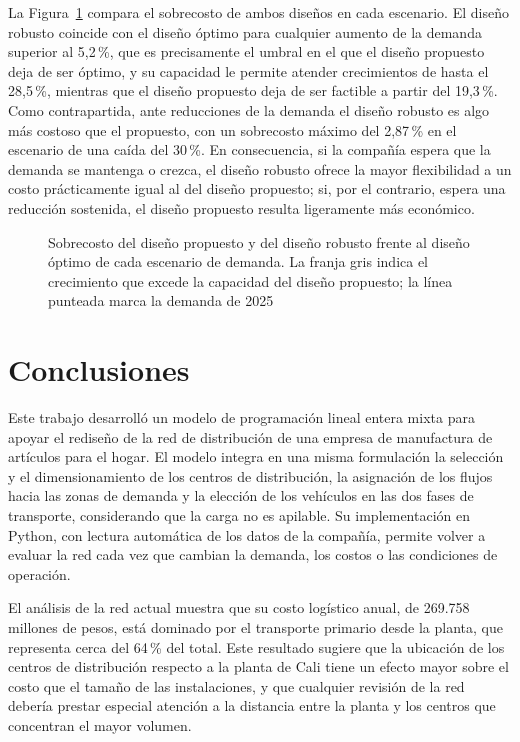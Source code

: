 \documentclass[fleqn, 11pt,letterpaper]{article}
\begin{document}
La Figura~\ref{fig:sensibilidad_robusto} compara el sobrecosto de ambos diseños en cada escenario. El diseño robusto coincide con el diseño óptimo para cualquier aumento de la demanda superior al 5,2\,\%, que es precisamente el umbral en el que el diseño propuesto deja de ser óptimo, y su capacidad le permite atender crecimientos de hasta el 28,5\,\%, mientras que el diseño propuesto deja de ser factible a partir del 19,3\,\%. Como contrapartida, ante reducciones de la demanda el diseño robusto es algo más costoso que el propuesto, con un sobrecosto máximo del 2,87\,\% en el escenario de una caída del 30\,\%. En consecuencia, si la compañía espera que la demanda se mantenga o crezca, el diseño robusto ofrece la mayor flexibilidad a un costo prácticamente igual al del diseño propuesto; si, por el contrario, espera una reducción sostenida, el diseño propuesto resulta ligeramente más económico.

\begin{figure}[H]
    \centering
    
    \caption{Sobrecosto del diseño propuesto y del diseño robusto frente al diseño óptimo de cada escenario de demanda. La franja gris indica el crecimiento que excede la capacidad del diseño propuesto; la línea punteada marca la demanda de 2025}
    \label{fig:sensibilidad_robusto}
\end{figure}


\section{Conclusiones}
Este trabajo desarrolló un modelo de programación lineal entera mixta para apoyar el rediseño de la red de distribución de una empresa de manufactura de artículos para el hogar. El modelo integra en una misma formulación la selección y el dimensionamiento de los centros de distribución, la asignación de los flujos hacia las zonas de demanda y la elección de los vehículos en las dos fases de transporte, considerando que la carga no es apilable. Su implementación en Python, con lectura automática de los datos de la compañía, permite volver a evaluar la red cada vez que cambian la demanda, los costos o las condiciones de operación.

El análisis de la red actual muestra que su costo logístico anual, de 269.758 millones de pesos, está dominado por el transporte primario desde la planta, que representa cerca del 64\,\% del total. Este resultado sugiere que la ubicación de los centros de distribución respecto a la planta de Cali tiene un efecto mayor sobre el costo que el tamaño de las instalaciones, y que cualquier revisión de la red debería prestar especial atención a la distancia entre la planta y los centros que concentran el mayor volumen.
\end{document}
